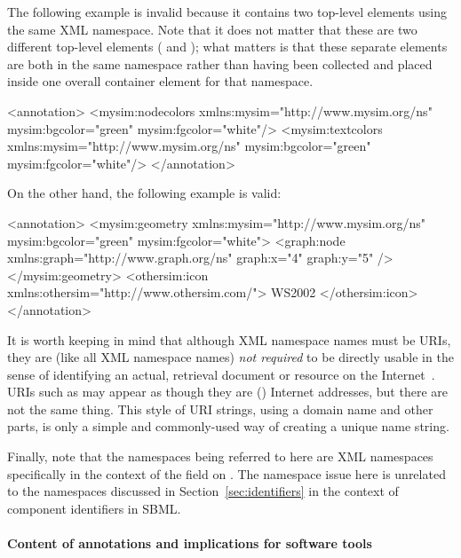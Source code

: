 The following example is invalid because it contains two top-level
elements using the same XML namespace.  Note that it does not
matter that these are two different top-level elements
( and ); what matters is
that these separate elements are both in the same namespace rather
than having been collected and placed inside one overall container
element for that namespace.

\begin{example}
<annotation>
    <mysim:nodecolors xmlns:mysim="http://www.mysim.org/ns"
        mysim:bgcolor="green"
        mysim:fgcolor="white"/>
    <mysim:textcolors xmlns:mysim="http://www.mysim.org/ns"
        mysim:bgcolor="green"
        mysim:fgcolor="white"/>
</annotation>
\end{example}

On the other hand, the following example is valid:

\begin{example}
<annotation>
    <mysim:geometry xmlns:mysim="http://www.mysim.org/ns"
         mysim:bgcolor="green" mysim:fgcolor="white">
        <graph:node xmlns:graph="http://www.graph.org/ns" graph:x="4" graph:y="5" />
    </mysim:geometry>
    <othersim:icon xmlns:othersim="http://www.othersim.com/">
        WS2002
    </othersim:icon>
</annotation>
\end{example}

It is worth keeping in mind that although XML namespace names must
be URIs, they are (like all XML namespace names) \emph{not
  required} to be directly usable in the sense of identifying an
actual, retrieval document or resource on the
Internet~\citep{bray:1999}.  URIs such as
 may appear as though they are (\eg)
Internet addresses, but there are not the same thing.  This style
of URI strings, using a domain name and other parts, is only a
simple and commonly-used way of creating a unique name string.

Finally, note that the namespaces being referred to here are XML
namespaces specifically in the context of the 
field on \SBase.  The namespace issue here is unrelated to the
namespaces discussed in Section~\ref{sec:identifiers} in the
context of component identifiers in SBML.


\paragraph{Content of annotations and implications for software tools}

